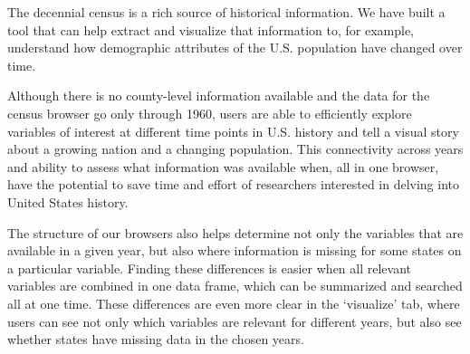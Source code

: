 \documentclass[DIV=calc, paper=a4, fontsize=10pt, twocolumn]{scrartcl}\usepackage[]{graphicx}\usepackage[]{color}
\begin{document}
\par The decennial census is a rich source of historical information. We have built a tool that can help extract and visualize that information to, for example, understand how demographic attributes of the U.S. population have changed over time.

\par Although there is no county-level information available and the data for the census browser go only through 1960, users are able to efficiently explore variables of interest at different time points in U.S. history and tell a visual story about a growing nation and a changing population. This connectivity across years and ability to assess what information was available when, all in one browser, have the potential to save time and effort of researchers interested in delving into United States history.

\par The structure of our browsers also helps determine not only the variables that are available in a given year, but also where information is missing for some states on a particular variable. Finding these differences is easier when all relevant variables are combined in one data frame, which can be summarized and searched all at one time. These differences are even more clear in the `visualize' tab, where users can see not only which variables are relevant for different years, but also see whether states have missing data in the chosen years.  







\end{document}

